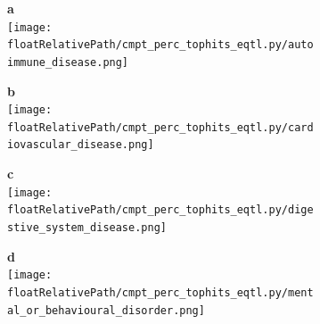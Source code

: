 %
%

\begin{figure}[!tbp]

\begin{subfigure}[]{.24\textwidth}
\textbf{a}
\\
\texttt{[image: \\floatRelativePath/cmpt\_perc\_tophits\_eqtl.py/autoimmune\_disease.png]}
\end{subfigure}
%
\begin{subfigure}[]{.24\textwidth}
\textbf{b}
\\
\texttt{[image: \\floatRelativePath/cmpt\_perc\_tophits\_eqtl.py/cardiovascular\_disease.png]}
\end{subfigure}
%
\begin{subfigure}[]{.24\textwidth}
\textbf{c}
\\
\texttt{[image: \\floatRelativePath/cmpt\_perc\_tophits\_eqtl.py/digestive\_system\_disease.png]}
\end{subfigure}
%
\begin{subfigure}[]{.24\textwidth}
\textbf{d}
\\
\texttt{[image: \\floatRelativePath/cmpt\_perc\_tophits\_eqtl.py/mental\_or\_behavioural\_disorder.png]}
\end{subfigure}

\caption{}
\label{fig:region_gwas_egenes_tissues}
%
\end{figure}

%
%

